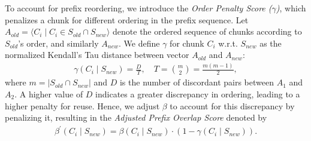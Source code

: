 To account for prefix reordering, we introduce the \textit{Order Penalty Score ($\gamma$)}, which penalizes a chunk for different ordering in the prefix sequence. 
Let \( A_{old} = \langle C_i \mid C_i \in S_{old} \cap S_{new} \rangle \) 
denote the ordered sequence of chunks according to $S_{old}$'s order, and similarly $A_{new}$. We define $\gamma$ for chunk $C_{i}$ w.r.t. $S_{new}$ as the normalized Kendall's Tau distance \cite{cicirello2019kendall} between vector $A_{old}$ and $A_{new}$:
\begin{align}
\gamma(C_{i} \mid S_{new}) = \frac{D}{T},  \quad T = \binom{m}{2} = \frac{m(m-1)}{2},
\end{align}
where $m=|S_{old} \cap S_{new}|$ and \(D\) is the number of discordant pairs between \(A_{1}\) and \(A_{2}\). A higher value of \(D\) indicates a greater discrepancy in ordering, leading to a higher penalty for reuse. Hence, we adjust \(\beta\) to account for this discrepancy by penalizing it, resulting in the
\textit{Adjusted Prefix Overlap Score} denoted by
\begin{align}
    \beta^{'} (C_{i} \mid S_{new}) = \beta (C_{i} \mid S_{new}) \cdot (1 - \gamma (C_{i} \mid S_{new})).
\end{align}


